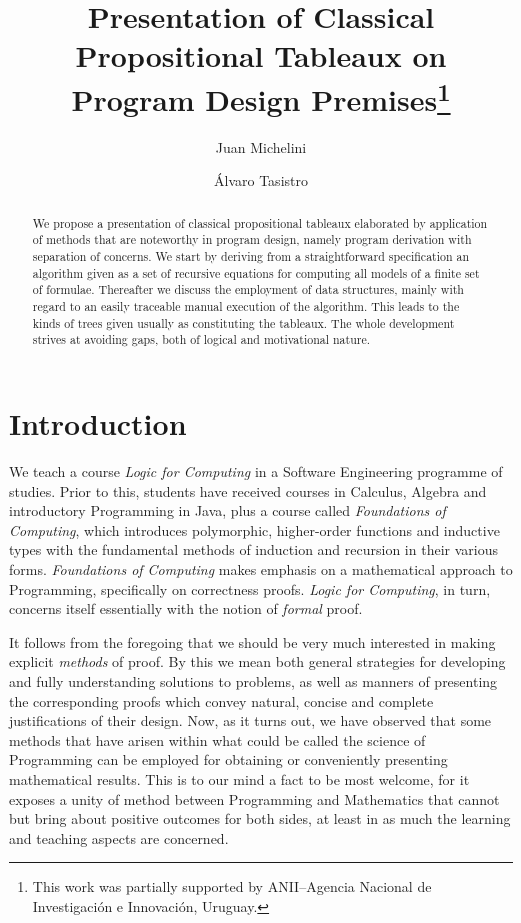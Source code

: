 \documentclass[a4paper,UKenglish]{lipics}
\title{Presentation of Classical Propositional Tableaux on Program Design Premises\footnote{This work was partially supported by ANII--Agencia Nacional de Investigaci\'on e Innovaci\'on, Uruguay.}}
\author{Juan Michelini}
\author{\'Alvaro Tasistro}
\affil{Universidad ORT Uruguay\\  \texttt{michelini@ort.edu.uy}, \texttt{tasistro@ort.edu.uy}}
\newcounter{c}
\begin{document}
\maketitle
\begin{abstract}
We propose a presentation of classical propositional tableaux elaborated by application of methods that are noteworthy in program design, namely program derivation with separation of concerns.  We start by deriving from a straightforward specification an algorithm given as a set of recursive equations for computing all models of a finite set of formulae. 
Thereafter we discuss the employment of data structures, mainly with regard to an easily traceable manual execution of the algorithm. This leads to the kinds of trees given usually as constituting the tableaux.
The whole development strives at avoiding gaps, both of logical and motivational nature.
\end{abstract}

\section{Introduction}


We teach a course \textit{Logic for Computing} in a Software Engineering programme of studies. Prior to this, students have received courses in Calculus, Algebra and introductory Programming in Java, plus a course called \textit{Foundations of Computing}, which introduces  polymorphic, higher-order functions and inductive types with the fundamental methods of  induction and recursion in their various forms. \textit{Foundations of Computing} makes emphasis on a mathematical approach to Programming, specifically on correctness proofs.
 \textit{Logic for Computing}, in turn, concerns itself essentially with the notion of \emph{formal} proof.


It follows from the foregoing that we should be very much interested in making explicit \emph{methods} of proof. By this we mean both general strategies for developing and fully understanding solutions to problems, as well as manners of presenting the corresponding proofs which convey natural, concise and complete justifications of their design.
Now, as it turns out, we have observed that some methods that have arisen within what could be called the science of Programming can be employed for obtaining or conveniently presenting mathematical results. This is to our mind a fact to be most welcome, for it exposes a unity of method between Programming and Mathematics that cannot but bring about positive outcomes for both sides, at least in as much the learning and teaching aspects are concerned.
\end{document}
